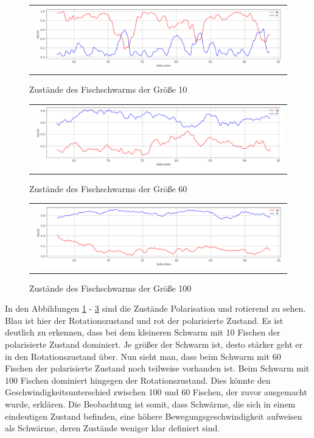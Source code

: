 \begin{figure}[H]
\centering
\begin{tabular}{l}
\includegraphics[width=1.0\textwidth]{figures/Experimente/Tracking/zustaende_10F.png} 
\end{tabular}
\caption{ Zustände des Fischschwarms der Größe 10} \label{fig:zust_10}
\end{figure}

\begin{figure}[H]
\centering
\begin{tabular}{l}
\includegraphics[width=1.0\textwidth]{figures/Experimente/Tracking/zustaende_60F.png} 
\end{tabular}
\caption{ Zustände des Fischschwarms der Größe 60} \label{fig:zust_60}
\end{figure}

\begin{figure}[H]
\centering
\begin{tabular}{l}
\includegraphics[width=1.0\textwidth]{figures/Experimente/Tracking/zustaende_100F.png} 
\end{tabular}
\caption{ Zustände des Fischschwarms der Größe 100} \label{fig:zust_100}
\end{figure}

In den Abbildungen \ref{fig:zust_10} - \ref{fig:zust_100} sind die Zustände Polarisation und rotierend zu sehen. Blau ist hier der Rotationszustand und rot der polarisierte Zustand. Es ist deutlich zu erkennen, dass bei dem kleineren Schwarm mit 10 Fischen der polarisierte Zustand dominiert. Je größer der Schwarm ist, desto stärker geht er in den Rotationszustand über. Nun sieht man, dass beim Schwarm mit 60 Fischen der polarisierte Zustand noch teilweise vorhanden ist. Beim Schwarm mit 100 Fischen dominiert hingegen der Rotationszustand. Dies könnte den Geschwindigkeitsunterschied zwischen 100 und 60 Fischen, der zuvor ausgemacht wurde, erklären. Die Beobachtung ist somit, dass Schwärme, die sich in einem eindeutigen Zustand befinden, eine höhere Bewegungsgeschwindigkeit aufweisen als Schwärme, deren Zustände weniger klar definiert sind.

